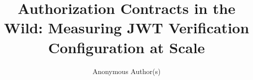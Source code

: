 \documentclass[sigconf,anonymous,review]{acmart}
\title{Authorization Contracts in the Wild: Measuring JWT Verification
Configuration at Scale}
\author{Anonymous Author(s)}
\affiliation{\institution{Submitted for double-blind review}\country{}}
\begin{document}

\gdef\keywayabstractdone{}
\maketitle




\end{document}
